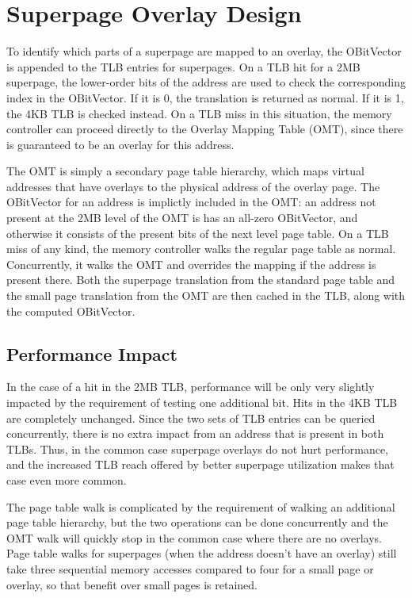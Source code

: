 \chapter{Superpage Overlay Design}

To identify which parts of a superpage are mapped to an overlay, the OBitVector is appended to the TLB entries for superpages. On a TLB hit for a 2MB superpage, the lower-order bits of the address are used to check the corresponding index in the OBitVector. If it is 0, the translation is returned as normal. If it is 1, the 4KB TLB is checked instead. On a TLB miss in this situation, the memory controller can proceed directly to the Overlay Mapping Table (OMT), since there is guaranteed to be an overlay for this address.

The OMT is simply a secondary page table hierarchy, which maps virtual addresses that have overlays to the physical address of the overlay page. The OBitVector for an address is implictly included in the OMT: an address not present at the 2MB level of the OMT is has an all-zero OBitVector, and otherwise it consists of the present bits of the next level page table. On a TLB miss of any kind, the memory controller walks the regular page table as normal. Concurrently, it walks the OMT and overrides the mapping if the address is present there. Both the superpage translation from the standard page table and the small page translation from the OMT are then cached in the TLB, along with the computed OBitVector.

\section{Performance Impact}
In the case of a hit in the 2MB TLB, performance will be only very slightly impacted by the requirement of testing one additional bit. Hits in the 4KB TLB are completely unchanged. Since the two sets of TLB entries can be queried concurrently, there is no extra impact from an address that is present in both TLBs. Thus, in the common case superpage overlays do not hurt performance, and the increased TLB reach offered by better superpage utilization makes that case even more common.

The page table walk is complicated by the requirement of walking an additional page table hierarchy, but the two operations can be done concurrently and the OMT walk will quickly stop in the common case where there are no overlays. Page table walks for superpages (when the address doesn't have an overlay) still take three sequential memory accesses compared to four for a small page or overlay, so that benefit over small pages is retained.

